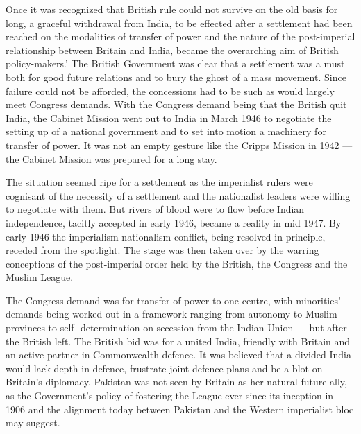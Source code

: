Once it was recognized that British rule could not survive on the old basis for long, a graceful withdrawal from India, to be effected after a settlement had been reached on the modalities of transfer of power and the nature of the post-imperial relationship between Britain and India, became the overarching aim of British policy-makers.' The British Government was clear that a settlement was a must both for good future relations and to bury the ghost of a mass movement. Since failure could not be afforded, the concessions had to be such as would largely meet Congress demands. With the Congress demand being that the British quit India, the Cabinet Mission went out to India in March 1946 to negotiate the setting up of a national government and to set into motion a machinery for transfer of power. It was not an empty gesture like the Cripps Mission in 1942 — the Cabinet Mission was prepared for a long stay. 

The situation seemed ripe for a settlement as the imperialist rulers were cognisant of the necessity of a settlement and the nationalist leaders were willing to negotiate with them. But rivers of blood were to flow before Indian independence, tacitly accepted in early 1946, became a reality in mid 1947. By early 1946 the imperialism nationalism conflict, being resolved in principle, receded from the spotlight. The stage was then taken over by the warring conceptions of the post-imperial order held by the British, the Congress and the Muslim League. 

The Congress demand was for transfer of power to one centre, with minorities' demands being worked out in a framework ranging from autonomy to Muslim provinces to self- determination on secession from the Indian Union — but after the British left. The British bid was for a united India, friendly with Britain and an active partner in Commonwealth defence. It was believed that a divided India would lack depth in defence, frustrate joint defence plans and be a blot on Britain's diplomacy. Pakistan was not seen by Britain as her natural future ally, as the Government's policy of fostering the League ever since its inception in 1906 and the alignment today between Pakistan and the Western imperialist bloc may suggest. 

